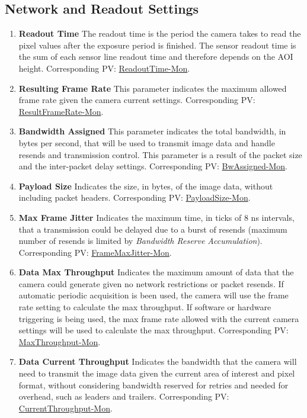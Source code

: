 \documentclass[openany]{article}
\begin{document}
    \subsection{Network and Readout Settings}\label{sec:network-and-readout}

        \begin{enumerate}
            \item \textbf{Readout Time} The readout time is the period the camera takes to read the pixel values after the exposure period is finished. The sensor readout time is the sum of each sensor line readout time and therefore depends on the AOI height. Corresponding PV: \hyperlink{pv:readout-time}{ReadoutTime-Mon}.
            \item \textbf{Resulting Frame Rate} This parameter indicates the maximum allowed frame rate given the camera current settings. Corresponding PV: \hyperlink{pv:result-frame-rate}{ResultFrameRate-Mon}.
            \item \textbf{Bandwidth Assigned} This parameter indicates the total bandwidth, in bytes per second, that will be used to transmit image data and handle resends and transmission control. This parameter is a result of the packet size and the inter-packet delay settings. Corresponding PV: \hyperlink{pv:bw-assigned}{BwAssigned-Mon}.
            \item \textbf{Payload Size} Indicates the size, in bytes, of the image data, without including packet headers. Corresponding PV: \hyperlink{pv:payload-size}{PayloadSize-Mon}.
            \item \textbf{Max Frame Jitter} Indicates the maximum time, in ticks of 8 ns intervals, that a transmission could be delayed due to a burst of resends (maximum number of resends is limited by \emph{Bandwidth Reserve Accumulation}). Corresponding PV: \hyperlink{pv:frame-max-jitter}{FrameMaxJitter-Mon}.
            \item \textbf{Data Max Throughput} Indicates the maximum amount of data that the camera could generate given no network restrictions or packet resends. If automatic periodic acquisition is been used, the camera will use the frame rate setting to calculate the max throughput. If software or hardware triggering is being used, the max frame rate allowed with the current camera settings will be used to calculate the max throughput. Corresponding PV: \hyperlink{pv:max-throughput}{MaxThroughput-Mon}.
            \item \textbf{Data Current Throughput} Indicates the bandwidth that the camera will need to transmit the image data given the current area of interest and pixel format, without considering bandwidth reserved for retries and needed for overhead, such as leaders and trailers. Corresponding PV: \hyperlink{pv:current-throughput}{CurrentThroughput-Mon}.

\end{enumerate}
\end{document}
